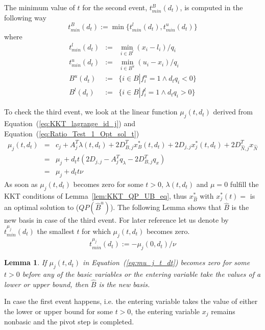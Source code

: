 \documentclass[a4paper]{article}
\newtheorem{lemma}{Lemma}
\begin{document}
The minimum value of $t$ for the second event, $t_{min}^{B}(d_{t})$, is computed
in the following way
\begin{equation}
\label{def:t_min_B}
t_{min}^{B}(d_{t}):=\min\{t_{min}^{l}(d_{t}), t_{min}^{u}(d_{t})\}
\end{equation}
where
\begin{eqnarray*}
t_{min}^{l}(d_{t})&:=& \min_{i \in B^{l}}\left(x_{i}-l_{i}\right)/q_{i} \\
t_{min}^{u}(d_{t})&:=& \min_{i \in B^{u}}\left(u_{i}-x_{i}\right)/q_{i} \\
B^{u}(d_{t})&:=&\{i \in B \left|\right. f_{i}^{u}=1 \wedge d_{t}q_{i}<0\} \\
B^{l}(d_{t})&:=&\{i \in B \left|\right. f_{i}^{l}=1 \wedge d_{t}q_{i}>0\} 
\end{eqnarray*} 

To check the third event, we look at the linear function $\mu_{j}(t,d_{t})$
derived from Equation~(\ref{eq:KKT_lagrange_id_j}) and
Equation~(\ref{eq:Ratio_Test_1_Opt_sol_t})
\begin{eqnarray}
\label{eq:mu_j_t_dt}
\mu_{j}(t, d_{t})
&=&
c_{j} + A_{j}^{T}\lambda(t, d_{t})+2D_{B,j}^{T}x_{B}^{*}(t, d_{t})
+2D_{j,j}x_{j}^{*}(t, d_{t})
+2D_{\hat{N},j}^{T}x_{\hat{N}} \nonumber \\
&=&
\mu_{j}+d_{t}t
\left(2D_{j,j}-A_{j}^{T}q_{\lambda}-2D_{B,j}^{T}q_{x}\right) \nonumber \\
&=&
\mu_{j}+d_{t}t\nu
\end{eqnarray}
As soon as $\mu_{j}(t, d_{t})$ becomes zero for some $t > 0$,
$\lambda(t, d_{t})$ and $\mu=0$ fulfill the KKT conditions of
Lemma~\ref{lem:KKT_QP_UB_eq}, thus $x_{\hat{B}}^{*}$ with $x_{j}^{*}(t)=$ is 
an optimal solution to ($QP(\hat{B}^{u})$). The following Lemma shows that
$\hat{B}$ is the new basis in case of the third event.
For later reference let us denote by $t_{min}^{\mu_{j}}(d_{t})$ 
the smallest $t$ for which $\mu_{j}(t, d_{t})$
becomes zero.
\begin{equation}
\label{def:t_min_mu_j}
t_{min}^{\mu_{j}}(d_{t}):=-\mu_{j}(0, d_{t})/\nu
\end{equation}
\begin{lemma}
\label{lem:new_basis}
If $\mu_{j}(t, d_{t})$ in Equation~(\ref{eq:mu_j_t_dt}) becomes zero for some
$t > 0$ before any of the basic variables or the entering variable take the
values of a lower or upper bound, then $\hat{B}$ is the new basis.
\end{lemma}
In case the first event happens, i.e. the entering variable takes the value of
either the lower or upper bound for some $t>0$,
the entering variable $x_{j}$ remains nonbasic and the pivot step is completed. 
\end{document}
